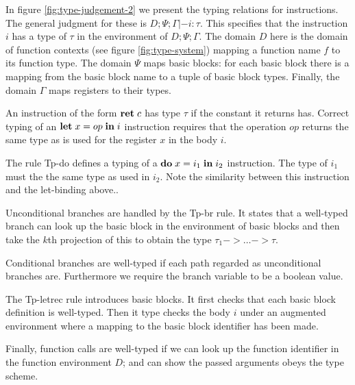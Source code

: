 \documentclass[a4paper, oneside, 10pt, draft]{memoir}
\begin{document}
In figure \ref{fig:type-judgement-2} we present the typing relations
for instructions. The general judgment for these is
$\boxed{D;\Psi;\Gamma |- i : \tau}$. This specifies that the
instruction $i$ has a type of $\tau$ in the environment of
$D;\Psi;\Gamma$. The domain $D$ here is the domain of function
contexts (see figure \ref{fig:type-system}) mapping a function name
$f$ to its function type. The domain $\Psi$ maps basic blocks: for
each basic block there is a mapping from the basic block name to a
tuple of basic block types. Finally, the domain $\Gamma$ maps
registers to their types.

An instruction of the form $\mathbf{ret} \; c$ has type $\tau$ if the constant
it returns has. Correct typing of an $\mathbf{let} \; x = op \; \mathbf{in} \; i$ instruction
requires that the operation $op$ returns the same type as is used for
the register $x$ in the body $i$.

The rule Tp-do defines a typing of a $\mathbf{do} \; x = i_1 \; \mathbf{in} \; i_2$
instruction. The type of $i_1$ must the the same type as used in
$i_2$. Note the similarity between this instruction and the
let-binding above..

Unconditional branches are handled by the Tp-br rule. It states that a
well-typed branch can look up the basic block in the environment of
basic blocks and then take the $k$th projection of this to obtain the
type $\tau_1 -> \dotsc -> \tau$.

Conditional branches are well-typed if each path regarded as
unconditional branches are. Furthermore we require the branch variable
to be a boolean value.

The Tp-letrec rule introduces basic blocks. It first checks that each
basic block definition is well-typed. Then it type checks the body $i$
under an augmented environment where a mapping to the basic block
identifier has been made.

Finally, function calls are well-typed if we can look up the function
identifier in the function environment $D$; and can show the
passed arguments obeys the type scheme.
\end{document}
